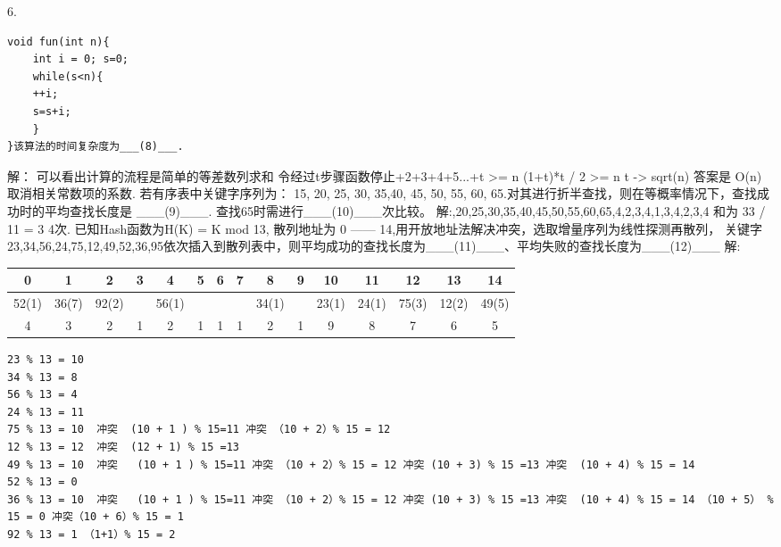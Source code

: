 6. 
\begin{lstlisting}[basicstyle=\small\ttfamily, caption={}, numbers=none]
void fun(int n){
	int i = 0; s=0;
	while(s<n){
	++i;
	s=s+i;
	}
}该算法的时间复杂度为___(8)___.
\end{lstlisting}
解：\newline
可以看出计算的流程是简单的等差数列求和\newline
令经过t步骤函数停止+2+3+4+5...+t >= n\newline
(1+t)*t / 2 >= n\newline
t -> sqrt(n) 答案是 O(n)  取消相关常数项的系数. 若有序表中关键字序列为： 15, 20, 25, 30, 35,40, 45, 50, 55, 60, 65.对其进行折半查找，则在等概率情况下，查找成功时的平均查找长度是
\_\_\_(9)\_\_\_. 查找65时需进行\_\_\_(10)\_\_\_次比较。\newline
解:,20,25,30,35,40,45,50,55,60,65,4,2,3,4,1,3,4,2,3,4   和为  33 / 11 = 3\newline
4次. 已知Hash函数为H(K) = K mod 13, 散列地址为 0 —— 14,用开放地址法解决冲突，选取增量序列为线性探测再散列， 关键字23,34,56,24,75,12,49,52,36,95依次插入到散列表中，则平均成功的查找长度为\_\_\_(11)\_\_\_、平均失败的查找长度为\_\_\_(12)\_\_\_\newline
解:\newline
\begin{tabular}{|c|c|c|c|c|c|c|c|c|c|c|c|c|c|c|}%
	\hline  %
	0 & 1 & 2 & 3 & 4 & 5 & 6 & 7 & 8 & 9 & 10 & 11 & 12 & 13 & 14 \\
	\hline  %
	52(1) & 36(7) & 92(2) &   & 56(1) &   &   &   & 34(1) &   & 23(1) & 24(1) & 75(3) & 12(2) & 49(5) \\
	\hline
	4 & 3 & 2 &  1 & 2 & 1 &  1 &  1 & 2 & 1 & 9 & 8 & 7 & 6 &  5  \\
	\hline %
\end{tabular}

\begin{lstlisting}[basicstyle=\small\ttfamily, caption={}, numbers=none]
23 % 13 = 10
34 % 13 = 8   
56 % 13 = 4
24 % 13 = 11
75 % 13 = 10  冲突  (10 + 1 ) % 15=11 冲突 （10 + 2）% 15 = 12
12 % 13 = 12  冲突  (12 + 1) % 15 =13 
49 % 13 = 10  冲突   (10 + 1 ) % 15=11 冲突 （10 + 2）% 15 = 12 冲突 (10 + 3) % 15 =13 冲突  (10 + 4) % 15 = 14
52 % 13 = 0 
36 % 13 = 10  冲突   (10 + 1 ) % 15=11 冲突 （10 + 2）% 15 = 12 冲突 (10 + 3) % 15 =13 冲突  (10 + 4) % 15 = 14 （10 + 5） % 15 = 0 冲突（10 + 6）% 15 = 1 
92 % 13 = 1 （1+1）% 15 = 2
\end{lstlisting}

